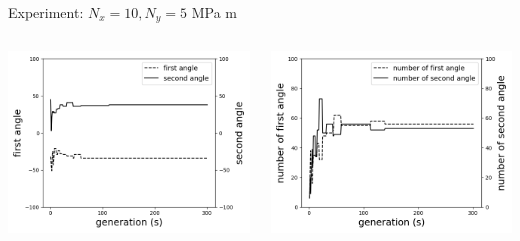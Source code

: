 \documentclass{beamer}
\begin{document}
\begin{frame}{Experiment: $N_x = 10, N_y=5 $ MPa m}
\begin{columns}
\begin{column}{0.5\textwidth}
        \begin{center}
			\includegraphics[width=1.0\linewidth]{./fig/two_distinct_angle_angle_change.png}
        \end{center}
    \end{column}
    \begin{column}{0.5\textwidth}
        \begin{center}
			\includegraphics[width=1.0\linewidth]{./fig/two_distinct_angler_number_change.png}
        \end{center}
    \end{column}
\end{columns}
\end{frame}
\end{document}
